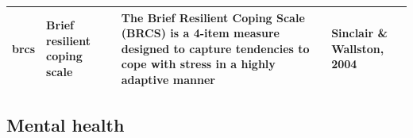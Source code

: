 \documentclass[]{book}
\begin{document}
\begin{longtable}[]{@{}llll@{}}
\begin{minipage}[t]{0.22\columnwidth}
brcs\strut
\end{minipage} & \begin{minipage}[t]{0.27\columnwidth}\raggedright
Brief resilient coping scale\strut
\end{minipage} & \begin{minipage}[t]{0.22\columnwidth}\raggedright
The Brief Resilient Coping Scale (BRCS) is a 4-item measure designed to capture tendencies to cope with stress in a highly adaptive manner\strut
\end{minipage} & \begin{minipage}[t]{0.18\columnwidth}\raggedright
Sinclair \& Wallston, 2004\strut
\end{minipage}\tabularnewline
\bottomrule
\end{longtable}

\hypertarget{mental-health}{%
\subsection{Mental health}\label{mental-health}}
\end{document}
